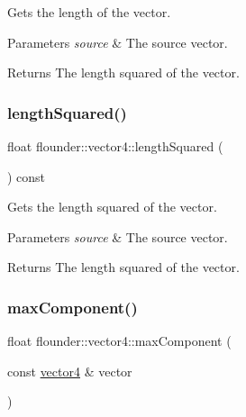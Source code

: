 Gets the length of the vector. 


\begin{DoxyParams}{Parameters}
{\em source} & The source vector. \\
\hline
\end{DoxyParams}
\begin{DoxyReturn}{Returns}
The length squared of the vector. 
\end{DoxyReturn}
\mbox{\label{classflounder_1_1vector4_a872050dbf8c90f8cf7f42d14d6dbe793}} 
\subsubsection{\texorpdfstring{length\+Squared()}{lengthSquared()}\hspace{0.1cm}{\footnotesize\ttfamily [2/2]}}
{\footnotesize\ttfamily float flounder\+::vector4\+::length\+Squared (\begin{DoxyParamCaption}{ }\end{DoxyParamCaption}) const}



Gets the length squared of the vector. 


\begin{DoxyParams}{Parameters}
{\em source} & The source vector. \\
\hline
\end{DoxyParams}
\begin{DoxyReturn}{Returns}
The length squared of the vector. 
\end{DoxyReturn}
\mbox{\label{classflounder_1_1vector4_ae9825f135cc1cefd981779b7df9bf1f6}} 
\subsubsection{\texorpdfstring{max\+Component()}{maxComponent()}}
{\footnotesize\ttfamily float flounder\+::vector4\+::max\+Component (\begin{DoxyParamCaption}\item[{const \hyperlink{classflounder_1_1vector4}{vector4} \&}]{vector }\end{DoxyParamCaption})\hspace{0.3cm}{\ttfamily [static]}}



